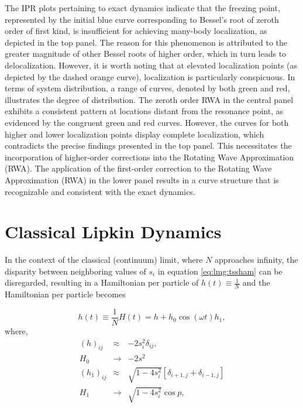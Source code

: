 \documentclass[%
reprint,
superscriptaddress,
amsmath,amssymb,
aps,
prb,
]{revtex4-2}
\begin{document}
	The IPR plots pertaining to exact dynamics indicate that the freezing point, represented by the initial blue curve corresponding to Bessel's root of zeroth order of first kind, is insufficient for achieving many-body localization, as depicted in the top panel. The reason for this phenomenon is attributed to the greater magnitude of other Bessel roots of higher order, which in turn leads to delocalization. However, it is worth noting that at elevated localization points (as depicted by the dashed orange curve), localization is particularly conspicuous. In terms of system distribution, a range of curves, denoted by both green and red, illustrates the degree of distribution. The zeroth order RWA in the central panel exhibits a consistent pattern at locations distant from the resonance point, as evidenced by the congruent green and red curves. However, the curves for both higher and lower localization points display complete localization, which contradicts the precise findings presented in the top panel. This necessitates the incorporation of higher-order corrections into the Rotating Wave Approximation (RWA). The application of the first-order correction to the Rotating Wave Approximation (RWA) in the lower panel results in a curve structure that is recognizable and consistent with the exact dynamics.
	
	\section{\label{sec:level4}Classical Lipkin Dynamics}
	In the context of the classical (continuum) limit, where $N$ approaches infinity, the disparity between neighboring values of $s_i$ in equation \ref{eq:lmg:tssham} can be disregarded, resulting in a Hamiltonian per particle of $h(t)\equiv \frac{1}{N}$ and the Hamiltonian per particle becomes
	
	\begin{equation}
	h(t)\equiv \frac{1}{N}H(t) = h + h_0\cos{(\omega t)}h_1,
	\end{equation}
	where,
	\begin{eqnarray}
	(h)_{ij} &\approx& - 2s^2_i \delta_{ij},\nonumber\\
	H_0 &\rightarrow& -2s^2\nonumber\\
	(h_1)_{ij} &\approx& \sqrt{1 - 4s^2_i}\left[\delta_{i+1, j}  + \delta_{i-1,j}\right]\nonumber\\
	H_1 &\rightarrow& \sqrt{1 - 4s^2_i}\cos{p},
	\end{eqnarray}
	
\end{document}

